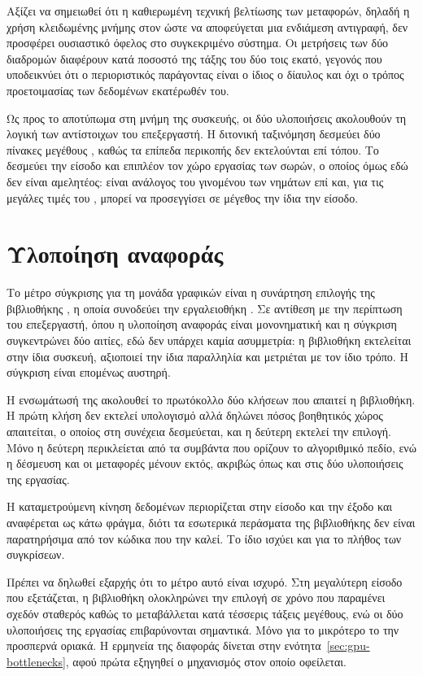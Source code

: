 Αξίζει να σημειωθεί ότι η καθιερωμένη τεχνική βελτίωσης των μεταφορών, δηλαδή η
χρήση κλειδωμένης μνήμης στον  ώστε να αποφεύγεται μια ενδιάμεση
αντιγραφή, δεν προσφέρει ουσιαστικό όφελος στο συγκεκριμένο σύστημα. Οι
μετρήσεις των δύο διαδρομών διαφέρουν κατά ποσοστό της τάξης του δύο τοις εκατό,
γεγονός που υποδεικνύει ότι ο περιοριστικός παράγοντας είναι ο ίδιος ο δίαυλος
και όχι ο τρόπος προετοιμασίας των δεδομένων εκατέρωθέν του.

Ως προς το αποτύπωμα στη μνήμη της συσκευής, οι δύο υλοποιήσεις ακολουθούν τη
λογική των αντίστοιχων του επεξεργαστή. Η διτονική ταξινόμηση δεσμεύει δύο
πίνακες μεγέθους , καθώς τα επίπεδα περικοπής δεν εκτελούνται επί τόπου.
Το  δεσμεύει την είσοδο και επιπλέον τον χώρο εργασίας των σωρών,
ο οποίος όμως εδώ δεν είναι αμελητέος: είναι ανάλογος του γινομένου των νημάτων
επί  και, για τις μεγάλες τιμές του , μπορεί να προσεγγίσει σε
μέγεθος την ίδια την είσοδο.

\section{Υλοποίηση αναφοράς}
\label{sec:gpu-reference}

Το μέτρο σύγκρισης για τη μονάδα γραφικών είναι η συνάρτηση επιλογής 
της βιβλιοθήκης , η οποία συνοδεύει την εργαλειοθήκη . Σε
αντίθεση με την περίπτωση του επεξεργαστή, όπου η υλοποίηση αναφοράς είναι
μονονηματική και η σύγκριση συγκεντρώνει δύο αιτίες, εδώ δεν υπάρχει καμία
ασυμμετρία: η βιβλιοθήκη εκτελείται στην ίδια συσκευή, αξιοποιεί την ίδια
παραλληλία και μετριέται με τον ίδιο τρόπο. Η σύγκριση είναι επομένως αυστηρή.

Η ενσωμάτωσή της ακολουθεί το πρωτόκολλο δύο κλήσεων που απαιτεί η βιβλιοθήκη.
Η πρώτη κλήση δεν εκτελεί υπολογισμό αλλά δηλώνει πόσος βοηθητικός χώρος
απαιτείται, ο οποίος στη συνέχεια δεσμεύεται, και η δεύτερη εκτελεί την επιλογή.
Μόνο η δεύτερη περικλείεται από τα συμβάντα που ορίζουν το αλγοριθμικό πεδίο,
ενώ η δέσμευση και οι μεταφορές μένουν εκτός, ακριβώς όπως και στις δύο
υλοποιήσεις της εργασίας.

Η καταμετρούμενη κίνηση δεδομένων περιορίζεται στην είσοδο και την έξοδο και
αναφέρεται ως κάτω φράγμα, διότι τα εσωτερικά περάσματα της βιβλιοθήκης δεν
είναι παρατηρήσιμα από τον κώδικα που την καλεί. Το ίδιο ισχύει και για το
πλήθος των συγκρίσεων.

Πρέπει να δηλωθεί εξαρχής ότι το μέτρο αυτό είναι ισχυρό. Στη μεγαλύτερη είσοδο
που εξετάζεται, η βιβλιοθήκη ολοκληρώνει την επιλογή σε χρόνο που παραμένει
σχεδόν σταθερός καθώς το  μεταβάλλεται κατά τέσσερις τάξεις μεγέθους, ενώ
οι δύο υλοποιήσεις της εργασίας επιβαρύνονται σημαντικά. Μόνο για το μικρότερο
 το  την προσπερνά οριακά. Η ερμηνεία της διαφοράς δίνεται
στην ενότητα~\ref{sec:gpu-bottlenecks}, αφού πρώτα εξηγηθεί ο μηχανισμός στον
οποίο οφείλεται.

